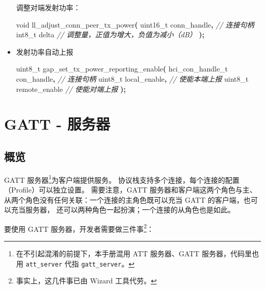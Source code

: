 \documentclass[
  12pt,
]{book}
\newenvironment{Shaded}{\begin{snugshade}}{\end{snugshade}}
\newcommand{\CommentTok}[1]{\textcolor[rgb]{0.56,0.35,0.01}{\textit{#1}}}
\newcommand{\DataTypeTok}[1]{\textcolor[rgb]{0.13,0.29,0.53}{#1}}
\newcommand{\NormalTok}[1]{#1}
\newcommand{\OperatorTok}[1]{\textcolor[rgb]{0.81,0.36,0.00}{\textbf{#1}}}
\begin{document}
\begin{itemize}
  调整对端发射功率：

\begin{Shaded}
\begin{Highlighting}[]
\DataTypeTok{void}\NormalTok{ ll\_adjust\_conn\_peer\_tx\_power}\OperatorTok{(}
  \DataTypeTok{uint16\_t}\NormalTok{ conn\_handle}\OperatorTok{,} \CommentTok{// 连接句柄}
  \DataTypeTok{int8\_t}\NormalTok{ delta          }\CommentTok{// 调整量，正值为增大，负值为减小（dB）}
\OperatorTok{);}
\end{Highlighting}
\end{Shaded}
\item
  发射功率自动上报

\begin{Shaded}
\begin{Highlighting}[]

\DataTypeTok{uint8\_t}\NormalTok{ gap\_set\_tx\_power\_reporting\_enable}\OperatorTok{(}
\NormalTok{  hci\_con\_handle\_t con\_handle}\OperatorTok{,}  \CommentTok{// 连接句柄}
  \DataTypeTok{uint8\_t}\NormalTok{ local\_enable}\OperatorTok{,}         \CommentTok{// 使能本端上报}
  \DataTypeTok{uint8\_t}\NormalTok{ remote\_enable         }\CommentTok{// 使能对端上报}
\OperatorTok{);}
\end{Highlighting}
\end{Shaded}
\end{itemize}

\hypertarget{ch-gatt-server}{%
\chapter{GATT - 服务器}\label{ch-gatt-server}}

\hypertarget{ux6982ux89c8-3}{%
\section{概览}\label{ux6982ux89c8-3}}

GATT 服务器\footnote{在不引起混淆的前提下，本手册混用 ATT 服务器、GATT 服务器，代码里也用 \texttt{att\_server} 代指 \texttt{gatt\_server}。}为客户端提供服务。
协议栈支持多个连接，每个连接的配置（Profile）可以独立设置。
需要注意，GATT 服务器和客户端这两个角色与主、从两个角色没有任何关联：一个连接的主角色既可以充当 GATT 的客户端，也可以充当服务器，
还可以两种角色一起扮演；一个连接的从角色也是如此。

要使用 GATT 服务器，开发者需要做三件事\footnote{事实上，这几件事已由 Wizard 工具代劳。}：
\end{document}
